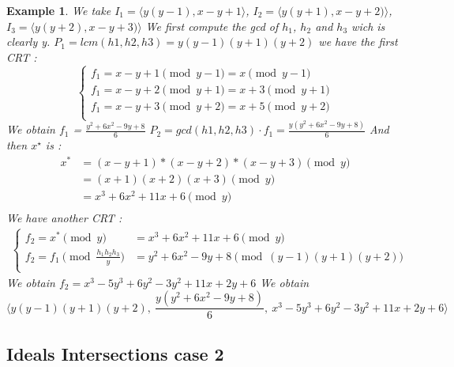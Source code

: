 \documentclass{article}
\newtheorem{example}{Example}[section]
\begin{document}
\begin {example}
    We take $I_{1} = \langle y(y-1),x-y+1\rangle$, $I_{2} = \langle y(y+1),x-y+2)\rangle$, $I_{3} = \langle y(y+2),x-y+3)\rangle$ \newline
    We first compute the gcd of $h_1$, $h_2$ and $h_3$ wich is clearly y.
    $P_{1} = lcm(h1,h2,h3) = y(y-1)(y+1)(y+2)$
    we have the first CRT :
    \begin{displaymath}
        \left\{
        \begin{array}{ll}
            f_{1} = x-y+1 \pmod{y-1} = x \pmod{y-1}\\
            f_{1} = x-y+2 \pmod{y+1} = x+3 \pmod{y+1}\\
            f_{1} = x-y+3 \pmod{y+2} = x+5 \pmod{y+2}\\
        \end{array}
        \right.
    \end{displaymath}
    We obtain $f_1$ = $\displaystyle \frac{y^{2}+6x^{2}-9y+8}{6}$ \newline
    $P_{2} = gcd(h1,h2,h3) \cdot f_{1} = \displaystyle \frac{y(y^{2}+6x^{2}-9y+8)}{6}$ \newline
    And then $x^{\star}$ is : 
    \begin{align*}
    x^{*} & = (x-y+1)*(x-y+2)*(x-y+3) \pmod{y}  \\
          & = (x+1)(x+2)(x+3) \pmod{y}          \\
          & = x^{3}+6x^{2}+11x+6 \pmod{y}      \\
    \end{align*}
    We have another CRT :
    \begin{align*}
        \left\{
        \begin{array}{ll}
            f_{2} = x^{*} \pmod{y}                                       & = x^{3}+6x^{2}+11x+6 \pmod{y}                  \\
            f_{2} = f_{1} \pmod{\displaystyle \frac{h_{1}h_{2}h_{3}}{y}} & =  y^{2}+6x^{2}-9y+8 \pmod{(y-1)(y+1)(y+2)}    \\
        \end{array}
        \right.
    \end{align*}
    We obtain $f_{2} = x^{3}-5y^{3}+6y^{2}-3y^{2}+11x+2y+6$
    We obtain \[\langle y(y-1)(y+1)(y+2),\ \frac{y(y^{2}+6x^{2}-9y+8)}{6},\ x^{3}-5y^{3}+6y^{2}-3y^{2}+11x+2y+6\rangle\]


\end{example}

\subsection*{Ideals Intersections case 2}
\end{document}
